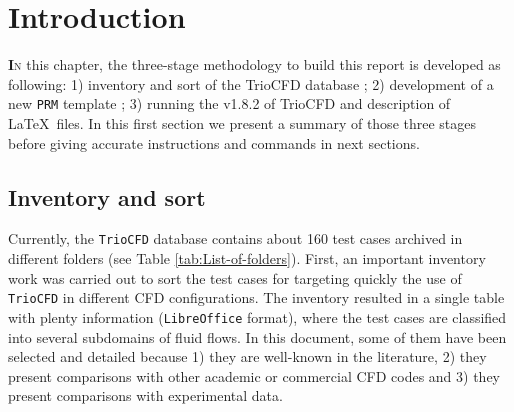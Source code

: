 \chapter{Introduction}

\lettrine[lines=2,slope=0pt,nindent=4pt]{\textbf{I}}{n} this chapter,
the three-stage methodology to build this report is developed as following:
1) inventory and sort of the \textsf{TrioCFD} database ; 2) development of a
new \texttt{PRM} template ; 3) running the \textsf{v1.8.2} of \textsf{TrioCFD} and description of \LaTeX~files.
In this first section we present a summary of those three stages before
giving accurate instructions and commands in next sections.

\section{Inventory and sort}
Currently, the \texttt{TrioCFD} database contains about 160 test
cases archived in different folders (see Table \ref{tab:List-of-folders}).
First, an important inventory work was carried out to sort the test
cases for targeting quickly the use of \texttt{TrioCFD} in different
CFD configurations. The inventory resulted in a single table with
plenty information (\texttt{LibreOffice} format), where the test cases
are classified into several subdomains of fluid flows. In this document,
some of them have been selected and detailed because 1) they are well-known
in the literature, 2) they present comparisons with other academic
or commercial CFD codes and 3) they present comparisons with experimental
data.


